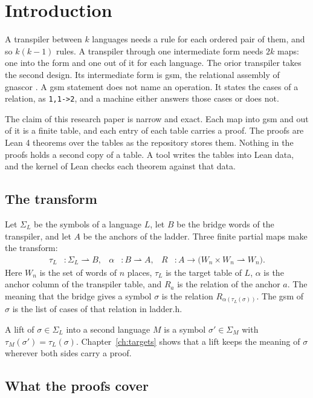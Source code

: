 \chapter{Introduction}
\label{ch:introduction}

A transpiler between $k$ languages needs a rule for each ordered pair of them, and so $k(k-1)$ rules. A
transpiler through one intermediate form needs $2k$ maps: one into the form and one out of it for each language.
The orior transpiler takes the second design. Its intermediate form is gsm, the relational assembly of gnascor
\cite{src:gnascor}. A gsm statement does not name an operation. It states the cases of a relation, as
\texttt{1,1->2}, and a machine either answers those cases or does not.

The claim of this research paper is narrow and exact. Each map into gsm and out of it is a finite table, and each
entry of each table carries a proof. The proofs are Lean 4 theorems \cite{src:lean4} over the tables as the
repository stores them. Nothing in the proofs holds a second copy of a table. A tool writes the tables into Lean
data, and the kernel of Lean checks each theorem against that data.

\section{The transform}

Let $\Sigma_L$ be the symbols of a language $L$, let $B$ be the bridge words of the transpiler, and let $A$ be the
anchors of the ladder. Three finite partial maps make the transform:
\begin{align*}
  \tau_L &: \Sigma_L \rightharpoonup B, &
  \alpha &: B \rightharpoonup A, &
  R &: A \to \bigl(W_n \times W_n \rightharpoonup W_n\bigr).
\end{align*}
Here $W_n$ is the set of words of $n$ places, $\tau_L$ is the target table of $L$, $\alpha$ is the anchor column
of the transpiler table, and $R_a$ is the relation of the anchor $a$. The meaning that the bridge gives a symbol
$\sigma$ is the relation $R_{\alpha(\tau_L(\sigma))}$. The gsm of $\sigma$ is the list of cases of that relation in
ladder.h.

A lift of $\sigma \in \Sigma_L$ into a second language $M$ is a symbol $\sigma' \in \Sigma_M$ with
$\tau_M(\sigma') = \tau_L(\sigma)$. Chapter~\ref{ch:targets} shows that a lift keeps the meaning of $\sigma$
wherever both sides carry a proof.

\section{What the proofs cover}

